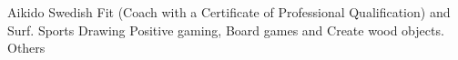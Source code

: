\begin{cvhonors}
  \cvhonor
    {Aikido}
    {Swedish Fit (Coach with a Certificate of Professional Qualification) and Surf.}
    {}
    {Sports}
  \cvhonor
    {Drawing}
    {Positive gaming, Board games and Create wood objects.}
    {}
    {Others}
\end{cvhonors}
